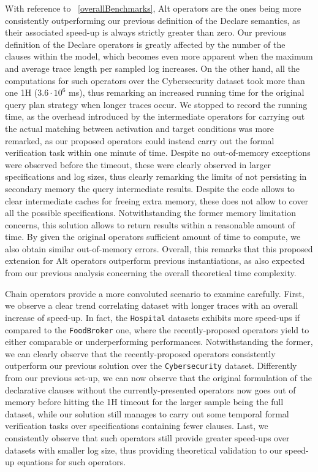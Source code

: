 \documentclass[sigconf]{acmart}
\begin{document}
With reference to \figurename~\ref{overallBenchmarks}, Alt operators are the ones being more consistently outperforming our previous definition of the Declare semantics, as their associated speed-up is always strictly greater than zero. Our previous definition of the Declare operators is greatly affected by the number of the clauses within the model, which becomes even more apparent when the maximum and average trace length per sampled log increases. On the other hand, all the computations for such operators over the Cybersecurity dataset took more than one 1H ($3.6\cdot 10^6$ ms), thus remarking an increased running time for the original query plan strategy when longer traces occur. We stopped to record the running time, as the overhead introduced by the intermediate operators for carrying out the actual matching between activation and target conditions was more remarked, as our proposed operators could instead carry out the formal verification task within one minute of time. Despite no out-of-memory exceptions were observed before the timeout, these were clearly observed in larger specifications and log sizes, thus clearly remarking the limits of not persisting in secondary memory the query intermediate results. Despite the code allows to clear intermediate caches for freeing extra memory, these does not allow to cover all the possible specifications. Notwithstanding the former memory limitation concerns, this solution allows to return results within a reasonable amount of time. By given the original operators sufficient amount of time to compute, we also obtain similar out-of-memory errors. Overall, this remarks that this proposed extension for Alt operators outperform previous instantiations, as also expected from our previous analysis concerning the overall theoretical time complexity.


Chain operators provide a more convoluted scenario to examine carefully. First, we observe a clear trend correlating dataset with longer traces with an overall increase of speed-up. In fact, the \texttt{Hospital} datasets exhibits more speed-ups if compared to the \texttt{FoodBroker} one, where the recently-proposed operators yield to either comparable or underperforming performances. Notwithstanding the former, we can clearly observe that the recently-proposed operators consistently outperform our previous solution over the \texttt{Cybersecurity} dataset. Differently from our previous set-up, we can now observe that the original formulation of the declarative clauses without the currently-presented operators now goes out of memory before hitting the 1H timeout for the larger sample being the full dataset, while our solution still manages to carry out some temporal formal verification tasks over specifications containing fewer clauses. Last, we consistently observe that such operators still provide greater speed-ups over datasets with smaller log size, thus providing theoretical validation to our speed-up equations for such operators.
\end{document}

